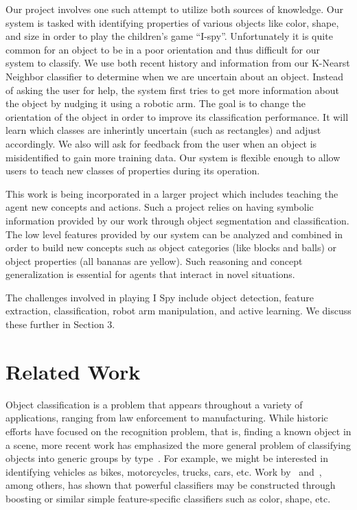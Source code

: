 \documentclass[11pt]{article}
\newcommand{\xxx}[1]{{\bf \color{red} #1}}
\begin{document}
Our project involves one such attempt to utilize both sources of knowledge. Our system is tasked with identifying properties of various objects like color, shape, and size in order to play the children's game ``I-spy''. Unfortunately it is quite common for an object to be in a poor orientation and thus difficult for our system to classify. We use both recent history and information from our K-Nearst Neighbor classifier to determine when we are uncertain about an object. Instead of asking the user for help, the system first tries to get more information about the object by nudging it using a robotic arm. The goal is to change the orientation of the object in order to improve its classification performance. It will learn which classes are inherintly uncertain (such as rectangles) and adjust accordingly. We also will ask for feedback from the user when an object is misidentified to gain more training data. Our system is flexible enough to allow users to teach new classes of properties during its operation. 

This work is being incorporated in a larger project which includes teaching the
agent new concepts and actions. Such a project relies on having
symbolic information provided by our work through object segmentation and
classification. The low level features provided by our system can be analyzed and
combined in order to build new concepts such as object categories (like blocks
and balls) or object properties (all bananas are yellow). Such reasoning and
concept generalization is essential for agents that interact in novel situations.

The challenges involved in playing I Spy include object detection, feature
extraction, classification, robot arm manipulation, and active learning. We
discuss these further in Section 3.

\section{Related Work}

Object classification is a problem that appears throughout a variety of
applications, ranging from law enforcement to manufacturing. While historic
efforts have focused on the recognition problem, that is, finding a known object
in a scene, more recent work has emphasized the more general problem of
classifying objects into generic groups by type~\cite{huber2004parts}. For example,
we might be interested in identifying vehicles as bikes, motorcycles, trucks,
cars, etc. Work by~\cite{nilsback2006visual} and~\cite{gehler2009feature}, among
others, has shown that powerful classifiers may be constructed through boosting
or similar simple feature-specific classifiers such as color, shape, etc.
\end{document}
